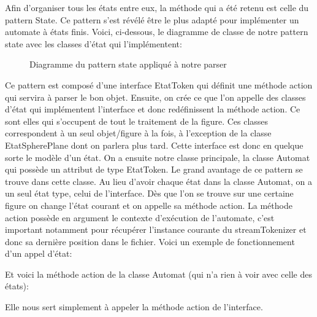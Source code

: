 \documentclass[../../Rapport RayTracer]{subfiles}
\begin{document}
Afin d'organiser tous les états entre eux, la méthode qui a été retenu est celle du pattern State. Ce pattern s'est révélé être le plus adapté pour implémenter un automate à états finis. Voici, ci-dessous, le diagramme de classe de notre pattern state avec les classes d'état qui l'implémentent:

\begin{figure}[h!]
	
	\caption{Diagramme du pattern state appliqué à notre parser}
	\label{diagrammePatternState}
\end{figure}
\FloatBarrier

Ce pattern est composé d'une interface EtatToken qui définit une méthode action qui servira à parser le bon objet. Ensuite, on crée ce que l'on appelle des classes d'état qui implémentent l'interface et donc redéfinissent la méthode action. Ce sont elles qui s'occupent de tout le traitement de la figure. Ces classes correspondent à un seul objet/figure à la fois, à l'exception de la classe EtatSpherePlane dont on parlera plus tard. Cette interface est donc en quelque sorte le modèle d'un état.
On a ensuite notre classe principale, la classe Automat qui possède un attribut de type EtatToken. Le grand avantage de ce pattern se trouve dans cette classe. Au lieu d'avoir chaque état dans la classe Automat, on a un seul état type, celui de l'interface. Dès que l'on se trouve sur une certaine figure on change l'état courant et on appelle sa méthode action. La méthode action possède en argument le contexte d'exécution de l'automate, c'est important notamment pour récupérer l'instance courante du streamTokenizer et donc sa dernière position dans le fichier. Voici un exemple de fonctionnement d'un appel d'état:

 
 

Et voici la méthode action de la classe Automat (qui n'a rien à voir avec celle des états):

 
 
Elle nous sert simplement à appeler la méthode action de l'interface.
\end{document}
